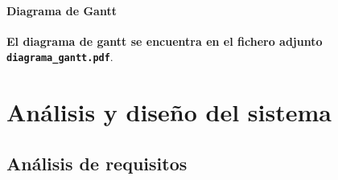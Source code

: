 \documentclass{article}
\begin{document}
\paragraph{Diagrama de Gantt}
\textbf{El diagrama de gantt se encuentra en el fichero adjunto \texttt{diagrama\_gantt.pdf}}.

\section{Análisis y diseño del sistema}
\subsection{Análisis de requisitos}
\end{document}
